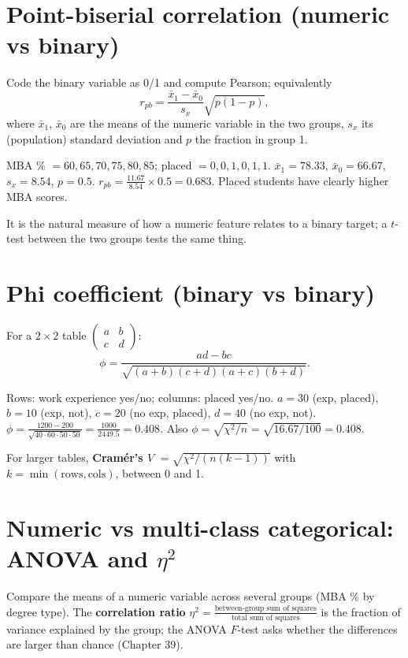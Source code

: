 \section{Point-biserial correlation (numeric vs binary)}
Code the binary variable as 0/1 and compute Pearson; equivalently
\[ r_{pb} = \frac{\bar x_1 - \bar x_0}{s_x}\sqrt{p(1-p)}, \]
where $\bar x_1$, $\bar x_0$ are the means of the numeric variable in the two groups, $s_x$ its (population) standard deviation and $p$ the fraction in group 1.
\begin{example}
MBA \% $= 60, 65, 70, 75, 80, 85$; placed $= 0, 0, 1, 0, 1, 1$. $\bar x_1 = 78.33$, $\bar x_0 = 66.67$, $s_x = 8.54$, $p = 0.5$.
$r_{pb} = \frac{11.67}{8.54}\times0.5 = 0.683$. Placed students have clearly higher MBA scores.
\end{example}
It is the natural measure of how a numeric feature relates to a binary target; a $t$-test between the two groups tests the same thing.

\section{Phi coefficient (binary vs binary)}
For a $2\times2$ table $\begin{pmatrix}a & b\\c & d\end{pmatrix}$:
\[ \phi = \frac{ad - bc}{\sqrt{(a+b)(c+d)(a+c)(b+d)}}. \]
\begin{example}[: phi]
Rows: work experience yes/no; columns: placed yes/no. $a = 30$ (exp, placed), $b = 10$ (exp, not), $c = 20$ (no exp, placed), $d = 40$ (no exp, not).
$\phi = \frac{1200 - 200}{\sqrt{40\cdot60\cdot50\cdot50}} = \frac{1000}{2449.5} = 0.408$. Also $\phi = \sqrt{\chi^2/n} = \sqrt{16.67/100} = 0.408$.
\end{example}
For larger tables, \textbf{Cram\'er's $V$} $= \sqrt{\chi^2/(n(k - 1))}$ with $k = \min(\text{rows}, \text{cols})$, between 0 and 1.

\section{Numeric vs multi-class categorical: ANOVA and $\eta^2$}
Compare the means of a numeric variable across several groups (MBA \% by degree type). The \textbf{correlation ratio} $\eta^2 = \frac{\text{between-group sum of squares}}
{\text{total sum of squares}}$ is the fraction of variance explained by the group; the ANOVA $F$-test asks whether the differences are larger than chance (Chapter 39).

